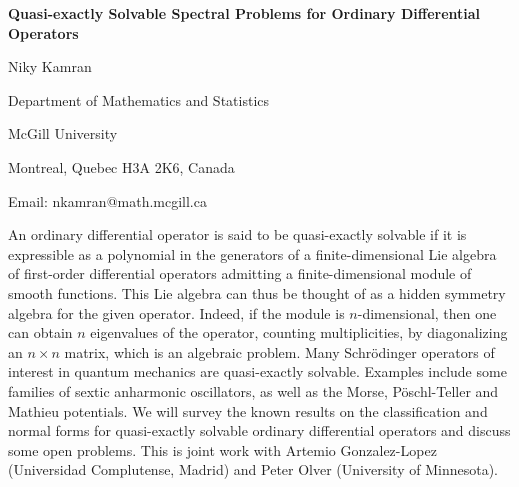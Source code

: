 

\centerline{\bf Quasi-exactly Solvable Spectral Problems for Ordinary
Differential Operators}

\vskip 0.3cm

\centerline{Niky Kamran}
\centerline{Department of Mathematics and Statistics}
\centerline{McGill University}
\centerline{Montreal, Quebec H3A 2K6, Canada}
\centerline{Email: nkamran@math.mcgill.ca}

\vskip 0.3cm

An ordinary differential operator is said to be quasi-exactly solvable if
it is expressible as a polynomial in the generators of a
finite-dimensional Lie algebra of first-order differential operators
admitting a finite-dimensional module of smooth functions. This Lie
algebra can thus be thought of as a hidden symmetry algebra for the
given operator. Indeed, if the module is $n$-dimensional, then one can
obtain $n$ eigenvalues of the operator, counting multiplicities, by
diagonalizing an $n \times n$ matrix, which is an algebraic problem. Many
Schr\"odinger operators of interest in quantum mechanics are quasi-exactly
solvable. Examples include some families of sextic anharmonic oscillators,
as well as the Morse, P\"oschl-Teller and Mathieu potentials. We
will survey the known results on the classification and normal forms for
quasi-exactly solvable ordinary differential operators and discuss some
open problems. This is joint work with Artemio Gonzalez-Lopez (Universidad
Complutense, Madrid) and Peter Olver (University of Minnesota).



